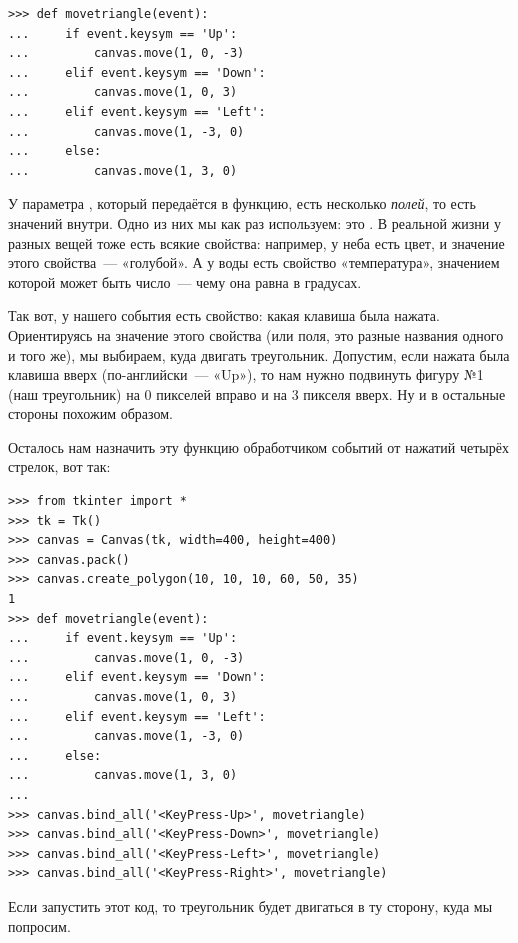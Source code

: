 \begin{listing}
\begin{verbatim}
>>> def movetriangle(event):
...     if event.keysym == 'Up':
...         canvas.move(1, 0, -3)
...     elif event.keysym == 'Down':
...         canvas.move(1, 0, 3)
...     elif event.keysym == 'Left':
...         canvas.move(1, -3, 0)
...     else:
...         canvas.move(1, 3, 0)
\end{verbatim}
\end{listing}

У параметра , который передаётся в функцию, есть несколько \emph{полей}, то есть значений внутри. Одно из них мы как раз используем: это . В реальной жизни у разных вещей тоже есть всякие свойства: например, у неба есть цвет, и значение этого свойства — «голубой». А у воды есть свойство «температура», значением которой может быть число — чему она равна в градусах.

Так вот, у нашего события есть свойство: какая клавиша была нажата. Ориентируясь на значение этого свойства (или поля, это разные названия одного и того же), мы выбираем, куда двигать треугольник. Допустим, если нажата была клавиша вверх (по-английски — «Up»), то нам нужно подвинуть фигуру №1 (наш треугольник) на 0 пикселей вправо и на 3 пикселя вверх. Ну и в остальные стороны похожим образом.

Осталось нам назначить эту функцию обработчиком событий от нажатий четырёх стрелок, вот так:

\begin{listing}
\begin{verbatim}
>>> from tkinter import *
>>> tk = Tk()
>>> canvas = Canvas(tk, width=400, height=400)
>>> canvas.pack()
>>> canvas.create_polygon(10, 10, 10, 60, 50, 35)
1 
>>> def movetriangle(event):
...     if event.keysym == 'Up':
...         canvas.move(1, 0, -3)
...     elif event.keysym == 'Down':
...         canvas.move(1, 0, 3)
...     elif event.keysym == 'Left':
...         canvas.move(1, -3, 0)
...     else:
...         canvas.move(1, 3, 0)
... 
>>> canvas.bind_all('<KeyPress-Up>', movetriangle)
>>> canvas.bind_all('<KeyPress-Down>', movetriangle)
>>> canvas.bind_all('<KeyPress-Left>', movetriangle)
>>> canvas.bind_all('<KeyPress-Right>', movetriangle)
\end{verbatim}
\end{listing}

Если запустить этот код, то треугольник будет двигаться в ту сторону, куда мы попросим.

\newpage